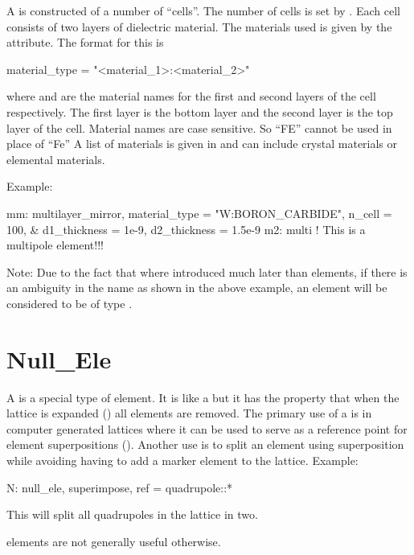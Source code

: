 {A  is constructed of a number of ``cells''. The
number of cells is set by . Each cell consists of two
layers of dielectric material. The materials used is given by
the  attribute. The format for this is
\begin{example}
  material_type = "<material_1>:<material_2>"
\end{example}
where  and  are the material names
for the first and second layers of the cell respectively. The first
layer is the bottom layer and the second layer is the top layer of the
cell.  Material names are case sensitive. So ``FE'' cannot be used in
place of ``Fe'' A list of materials is given in 
and can include crystal materials or elemental materials.

Example:
\begin{example}
  mm: multilayer_mirror, material_type = "W:BORON_CARBIDE", n_cell = 100, &
            d1_thickness = 1e-9, d2_thickness = 1.5e-9
  m2: multi    ! This is a multipole element!!!
\end{example}
Note: Due to the fact that  where introduced much later than 
elements, if there is an ambiguity in the name as shown in the above example, an element will be
considered to be of type .

\newpage

\section{Null_Ele}
\label{s:null.ele}

A  is a special type of element. It is like a  but it has the property that
when the lattice is expanded () all  elements are removed. The
primary use of a  is in computer generated lattices where it can be used to serve as a
reference point for element superpositions (). Another use is to split an element
using superposition while avoiding having to add a marker element to the lattice. Example:
\begin{example}
  N: null_ele, superimpose, ref = quadrupole::*
\end{example}
This will split all quadrupoles in the lattice in two.

 elements are not generally useful otherwise.


}
